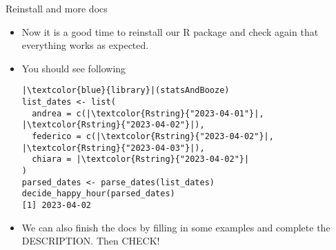 \documentclass[
hyperref={bookmarks=false},
xcolor={dvipsnames,svgnames*,x11names*}, 
12pt
]{beamer}
\begin{document}
\begin{frame}[fragile]{Reinstall and more docs}
\vspace{-0.5cm}
\begin{itemize}
\itemsep 2ex
\item Now it is a good time to reinstall our R package and check again that everything works as expected. 
\item You should see following
\begin{lstlisting}
|\textcolor{blue}{library}|(statsAndBooze)
list_dates <- list(
  andrea = c(|\textcolor{Rstring}{"2023-04-01"}|, |\textcolor{Rstring}{"2023-04-02"}|), 
  federico = c(|\textcolor{Rstring}{"2023-04-02"}|, |\textcolor{Rstring}{"2023-04-03"}|), 
  chiara = |\textcolor{Rstring}{"2023-04-02"}|
)
parsed_dates <- parse_dates(list_dates)
decide_happy_hour(parsed_dates)
[1] 2023-04-02
\end{lstlisting}
\item We can also finish the docs by filling in some examples and complete the DESCRIPTION. Then CHECK!
\end{itemize}
\end{frame}
\end{document}
